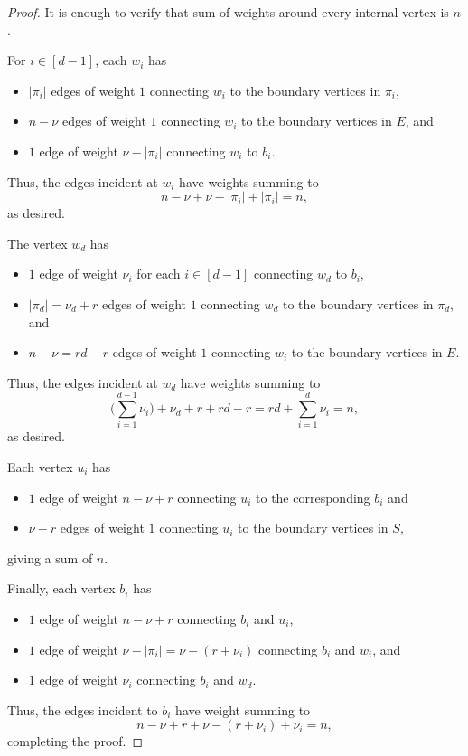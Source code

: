 \begin{proof}
    It is enough to verify that sum of weights around every internal vertex is $n$.

   For $i\in [d-1]$, each $w_i$  has 
\begin{itemize}
    \item $|\pi_i|$ edges of weight $1$ connecting $w_i$ to the boundary vertices in $\pi_i$,
    \item $n-\nu$ edges of weight $1$ connecting $w_i$ to the boundary vertices in $E$, and
    \item $1$ edge of weight $\nu-|\pi_i|$ connecting $w_i$ to $b_i$.
\end{itemize} 
Thus, the edges incident at $w_i$ have weights summing to \[n - \nu + \nu - |\pi_i| + |\pi_i| =n,\] as desired.
 
 The vertex $w_d$ has 
 \begin{itemize}
     \item $1$ edge of weight $\nu_i$ for each $i\in[d-1]$ connecting $w_d$ to $b_i$,
     \item $|\pi_d|=\nu_d+r$ edges of weight $1$ connecting $w_d$ to the boundary vertices in $\pi_d$, and
     \item $n-\nu = rd-r$ edges of weight $1$ connecting $w_i$ to the boundary vertices in $E$.
 \end{itemize}
 Thus, the edges incident at $w_d$ have weights summing to \[\Bigg( \sum_{i=1}^{d-1}\nu_i \Bigg) +\nu_d +r +rd-r = 
 rd + \sum_{i=1}^{d}\nu_i =n,\]
 as desired.
 
 
Each vertex $u_i$ has 
\begin{itemize}
    \item $1$ edge of weight $n-\nu+r$ connecting $u_i$ to the corresponding $b_i$ and
    \item $\nu-r$ edges of weight $1$ connecting $u_i$ to the boundary vertices in $S$,
\end{itemize}
giving a sum of $n$.

Finally, each vertex $b_i$ has 
\begin{itemize}
    \item $1$ edge of weight $n-\nu+r$ connecting $b_i$ and $u_i$,
    \item $1$ edge of weight $\nu-|\pi_i|=\nu-(r+\nu_i)$ connecting $b_i$ and $w_i$, and 
    \item $1$ edge of weight $\nu_i$ connecting $b_i$ and $w_d$.
\end{itemize}
Thus, the edges incident to $b_i$ have weight summing to 
\[
n-\nu + r + \nu-(r+\nu_i) +\nu_i= n,
\]
completing the proof.
\end{proof}



